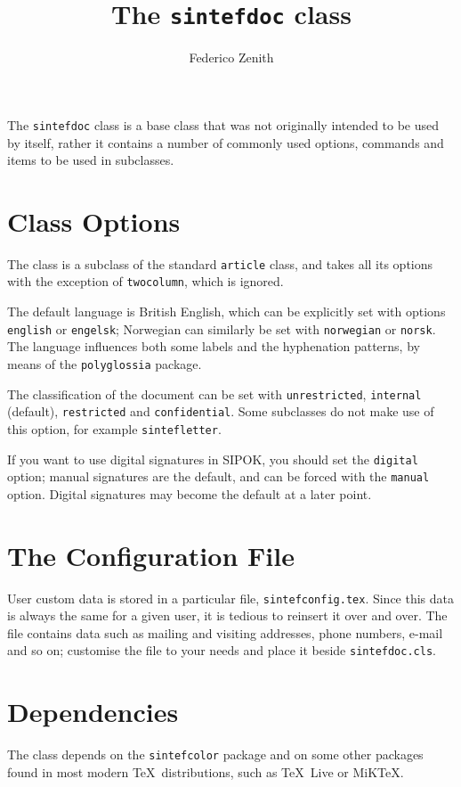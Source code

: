 \documentclass{sintefdoc}
\title{The \texttt{sintefdoc} class}
\author{Federico Zenith}
\begin{document}
\maketitle

The \texttt{sintefdoc} class is a base class that was not originally intended
to be used by itself, rather it contains a number of commonly used options,
commands and items to be used in subclasses.

\section{Class Options}
The class is a subclass of the standard \texttt{article} class, and takes all
its options with the exception of \texttt{twocolumn}, which is ignored.

The default language is British English, which can be explicitly set with
options \texttt{english} or \texttt{engelsk}; Norwegian can similarly be set
with \texttt{norwegian} or \texttt{norsk}.
The language influences both some labels and the hyphenation patterns,
by means of the \texttt{polyglossia} package.

The classification of the document can be set with
\texttt{unrestricted}, \texttt{internal} (default), \texttt{restricted} and
\texttt{confidential}.
Some subclasses do not make use of this option, for example
\texttt{sintefletter}.

If you want to use digital signatures in SIPOK, you should set the
\texttt{digital} option; manual signatures are the default, and can be
forced with the \texttt{manual} option.
Digital signatures may become the default at a later point.

\section{The Configuration File}
User custom data is stored in a particular file, \texttt{sintefconfig.tex}.
Since this data is always the same for a given user, it is tedious to reinsert
it over and over.
The file contains data such as mailing and visiting addresses, phone numbers,
e-mail and so on; customise the file to your needs and place it beside
\texttt{sintefdoc.cls}.

\section{Dependencies}
The class depends on the \texttt{sintefcolor} package and on some other packages
found in most modern \TeX\ distributions, such as \TeX\ Live or MiK\TeX.
\end{document}
